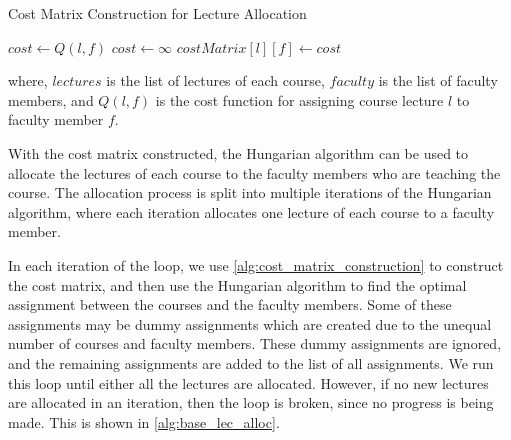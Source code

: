 \begin{algorithm}[H]
  \caption{Cost Matrix Construction for Lecture Allocation}
  \begin{algorithmic}[1]
    \State $cost \gets Q(l, f)$
    \Else
    \State $cost \gets \infty$
    \EndIf
    \State $costMatrix[l][f] \gets cost$
    \EndFor
    \EndFor
    \EndProcedure
  \end{algorithmic}
  \label{alg:cost_matrix_construction}
\end{algorithm}

where, \(lectures\) is the list of lectures of each course, \(faculty\) is the list of faculty members, and \(Q(l, f)\) is the cost function for assigning course lecture \(l\) to faculty member \(f\).

With the cost matrix constructed, the Hungarian algorithm can be used to allocate the lectures of each course to the faculty members who are teaching the course. The allocation process is split into multiple iterations of the Hungarian algorithm, where each iteration allocates one lecture of each course to a faculty member.

In each iteration of the loop, we use \autoref{alg:cost_matrix_construction} to construct the cost matrix, and then use the Hungarian algorithm to find the optimal assignment between the courses and the faculty members. Some of these assignments may be dummy assignments which are created due to the unequal number of courses and faculty members. These dummy assignments are ignored, and the remaining assignments are added to the list of all assignments. We run this loop until either all the lectures are allocated. However, if no new lectures are allocated in an iteration, then the loop is broken, since no progress is being made. This is shown in \autoref{alg:base_lec_alloc}.


